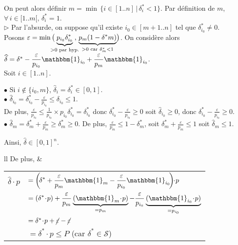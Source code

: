 \documentclass{scrartcl}
\renewcommand{\cal}[1]{\mathcal{#1}}
\newcommand{\dotp}{\! \cdot \!}
\newcommand{\1}{\mathbbm{1}}
\begin{document}
			On peut alors définir \( m = \min \, \{ i \in [1..n] \, | \, \delta^*_i < 1 \} \).
			Par définition de $m$, \( \forall \, i \in [1..m[, \, \delta^*_i = 1 \).
				\\[3mm]
			$\triangleright$ Par l'absurde, on suppose qu'il existe \( i_0 \in [m+1..n] \) tel que \( \delta^*_{i_0} \neq 0 \). \\
			Posons \( \varepsilon = \min \big( \!\!\!\!\! \underbrace{p_{i_0} \delta^*_{i_0}}_{> 0 \text{ par hyp.}} \!\!\!\! , \, \underbrace{p_m (1 - \delta^*m)}_{> 0 \text{ car } \delta^*_m < 1} \hspace{-0.6mm} \big) \).
			On considère alors \( \widehat{\delta} = \delta^* - \displaystyle \frac{\varepsilon}{p_{i_0}} \1_{i_0} + \frac{\varepsilon}{p_m} \1_{i_0}\).
				\\
			Soit $i \in [1..n]$. \\
			\hspace*{5mm} \parbox{170mm}{
				$\bullet$ Si \( i \notin \{ i_0, m \} \), \( \widehat{\delta}_i = \delta^*_i \in [0, 1] \). \\[1mm]
				$\bullet$ \( \displaystyle \widehat{\delta}_{i_0} = \delta^*_{i_0} - \frac{\varepsilon}{p_{i_0}} \leq \delta_{i_0} \leq 1 \). \\[-1mm]
				De plus, \( \displaystyle \frac{\varepsilon}{p_{i_0}} \leq \frac{1}{p_{i_0}} \times p_{i_0} \delta^*_{i_0} = \delta^*_{i_0}\) donc \( \displaystyle \delta^*_{i_0} - \frac{\varepsilon}{p_{i_0}} \geq 0 \) soit \( \widehat{\delta}_{i_0} \geq 0 \), donc \( \displaystyle \delta^*_{i_0} - \frac{\varepsilon}{p_{i_0}} \geq 0 \). \\[1mm]
				$\bullet$ \(\displaystyle \widehat{\delta}_m = \delta^*_m + \frac{\varepsilon}{p_m} \geq \delta^*_m \geq 0 \). %
				De plus, \( \displaystyle \frac{\varepsilon}{p_m} \leq 1 - \delta^*_m \), soit \( \displaystyle \delta^*_m + \frac{\varepsilon}{p_m} \leq 1 \) soit \( \widehat{\delta}_m \leq 1 \).
			}
			Ainsi, \( \widehat{\delta} \in [0, 1]^n \).
				\\[2.5mm]
			\hspace*{-3.5mm}
				\begin{tabular}[t]{ll}
					De plus, \hspace{-4mm} &
					\begin{tabular}[t]{ll}
						\( \widehat{\delta} \dotp p \) \hspace{-4mm}
						& \( = \displaystyle \left( \! \delta^* + \frac{\varepsilon}{p_m} \1_m - \frac{\varepsilon}{p_{i_0}} \1_{i_0} \! \right) \! \dotp p \) \\
						& \( = \displaystyle (\delta^* \dotp p ) + \frac{\varepsilon}{p_m} \underbrace{(\1_m \dotp p)}_{= p_m} - \frac{\varepsilon}{p_{i_0}} \underbrace{(\1_{i_0} \dotp p)}_{= p_{i_0}} \) \\[-2.5mm]
						& \( = \delta^* \dotp p + \cancel{\varepsilon} - \cancel{\varepsilon} \) \\
						& \( = \delta^* \dotp p \leq P \) \quad (car $\delta^* \in \cal{S}$)
					\end{tabular}
				\end{tabular} \\
\end{document}
